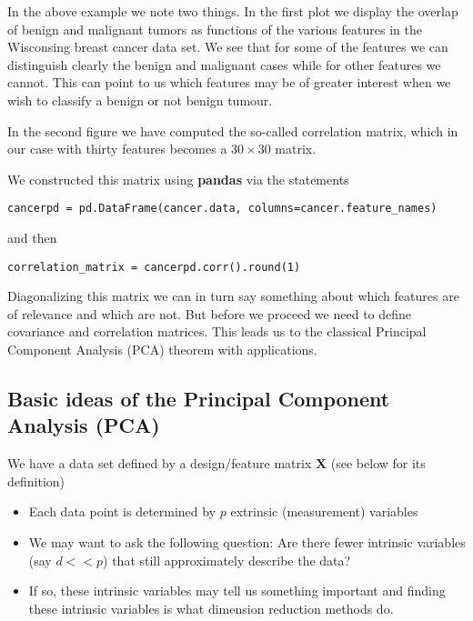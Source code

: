 \documentclass[%
oneside,                 %
final,                   %
10pt]{article}
\begin{document}
In the above example we note two things. In the first plot we display
the overlap of benign and malignant tumors as functions of the various
features in the Wisconsing breast cancer data set. We see that for
some of the features we can distinguish clearly the benign and
malignant cases while for other features we cannot. This can point to
us which features may be of greater interest when we wish to classify
a benign or not benign tumour.

In the second figure we have computed the so-called correlation
matrix, which in our case with thirty features becomes a $30\times 30$
matrix.

We constructed this matrix using \textbf{pandas} via the statements
\begin{verbatim}
cancerpd = pd.DataFrame(cancer.data, columns=cancer.feature_names)
\end{verbatim}
and then
\begin{verbatim}
correlation_matrix = cancerpd.corr().round(1)
\end{verbatim}

Diagonalizing this matrix we can in turn say something about which
features are of relevance and which are not. But before we proceed we
need to define covariance and correlation matrices. This leads us to
the classical Principal Component Analysis (PCA) theorem with
applications.



\subsection*{Basic ideas of the Principal Component Analysis (PCA)}

We have a data set defined by a design/feature matrix $\bm{X}$ (see below for its definition) 
\begin{itemize}
\item Each data point is determined by $p$ extrinsic (measurement) variables

\item We may want to ask the following question: Are there fewer intrinsic variables (say $d << p$) that still approximately describe the data?

\item If so, these intrinsic variables may tell us something important and finding these intrinsic variables is what dimension reduction methods do. 
\end{itemize}
\end{document}
